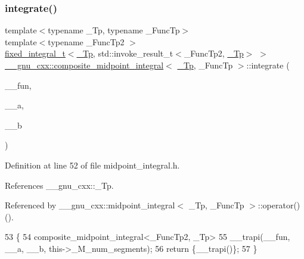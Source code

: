 \subsubsection{\texorpdfstring{integrate()}{integrate()}}
{\footnotesize\ttfamily template$<$typename \+\_\+\+Tp, typename \+\_\+\+Func\+Tp$>$ \\
template$<$typename \+\_\+\+Func\+Tp2 $>$ \\
\hyperlink{struct____gnu__cxx_1_1fixed__integral__t}{fixed\+\_\+integral\+\_\+t}$<$\hyperlink{namespace____gnu__cxx_a3b19a9c800ca194374ef9172290f7d79}{\+\_\+\+Tp}, std\+::invoke\+\_\+result\+\_\+t$<$\+\_\+\+Func\+Tp2, \hyperlink{namespace____gnu__cxx_a3b19a9c800ca194374ef9172290f7d79}{\+\_\+\+Tp}$>$ $>$ \hyperlink{class____gnu__cxx_1_1composite__midpoint__integral}{\+\_\+\+\_\+gnu\+\_\+cxx\+::composite\+\_\+midpoint\+\_\+integral}$<$ \hyperlink{namespace____gnu__cxx_a3b19a9c800ca194374ef9172290f7d79}{\+\_\+\+Tp}, \+\_\+\+Func\+Tp $>$\+::integrate (\begin{DoxyParamCaption}\item[{\+\_\+\+Func\+Tp2}]{\+\_\+\+\_\+fun,  }\item[{\hyperlink{namespace____gnu__cxx_a3b19a9c800ca194374ef9172290f7d79}{\+\_\+\+Tp}}]{\+\_\+\+\_\+a,  }\item[{\hyperlink{namespace____gnu__cxx_a3b19a9c800ca194374ef9172290f7d79}{\+\_\+\+Tp}}]{\+\_\+\+\_\+b }\end{DoxyParamCaption})\hspace{0.3cm}{\ttfamily [inline]}}



Definition at line 52 of file midpoint\+\_\+integral.\+h.



References \+\_\+\+\_\+gnu\+\_\+cxx\+::\+\_\+\+Tp.



Referenced by \+\_\+\+\_\+gnu\+\_\+cxx\+::midpoint\+\_\+integral$<$ \+\_\+\+Tp, \+\_\+\+Func\+Tp $>$\+::operator()().


\begin{DoxyCode}
53         \{
54           composite\_midpoint\_integral<\_FuncTp2, \_Tp>
55             \_\_trapi(\_\_fun, \_\_a, \_\_b, this->\_M\_num\_segments);
56           \textcolor{keywordflow}{return} \{\_\_trapi()\};
57         \}
\end{DoxyCode}
\mbox{\label{class____gnu__cxx_1_1composite__midpoint__integral_a28788cf79367faecd19fb307925223d0}} 
